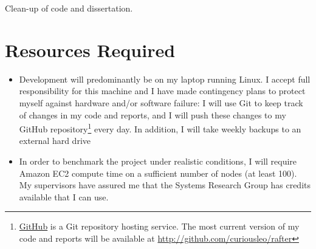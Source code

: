\documentclass[12pt]{scrartcl}
\begin{document}
Clean-up of code and dissertation.


\section{Resources Required%
  \label{resources-required}%
}
%
\begin{itemize}

\item Development will predominantly be on my laptop running Linux. I accept full responsibility for this machine and I have made contingency plans to protect myself against hardware and/or software failure: I will use Git to keep track of changes in my code and reports, and I will push these changes to my GitHub repository\footnote{\href{http://github.com}{GitHub} is a Git repository hosting service. The most current version of my code and reports will be available at \url{http://github.com/curiousleo/rafter}}  every day. In addition, I will take weekly backups to an external hard drive

\item In order to benchmark the project under realistic conditions, I will require Amazon EC2 compute time on a sufficient number of nodes (at least 100). My supervisors have assured me that the Systems Research Group has credits available that I can use.

\end{itemize}



\end{document}
